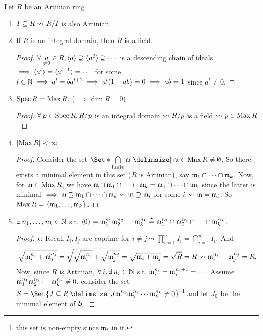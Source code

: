 \begin{prop}
  Let $R$ be an Artinian ring
  \begin{enumerate}[(1)]
    \item $I \subseteq R \leadsto {R}/{I}$ is also Artinian.
    \item If $R$ is an integral domain, then $R$ is a field.
      \begin{proof}
        $\forall \underset{\ne 0}{a} \in R, \gen{a} \supseteq \gen{a^2} \supseteq \dotsm$
        is a descending chain of ideals $\implies \langle a^l\rangle = \langle a^{l+1}\rangle = \dotsm$
        for some $l \in \mathbb{N} \implies a^l = ba^{l+1} \implies a^l(1 - ab) = 0
        \implies ab = 1$ since $a^l \ne 0$.
      \end{proof}
    \item $\operatorname{Spec} R = \operatorname{Max} R$. ($\implies \dim R = 0$)
      \begin{proof}
        $\forall p \in \Spec R, \quot{R}{p}$ is an integral domain
        $\leadsto {R}/{p}$ is a field $\leadsto p \in \operatorname{Max} R$.
      \end{proof}
    \item $\lvert\operatorname{Max} R\rvert < \infty$.
      \begin{proof}
        Consider the set $\Set*{ \bigcap\limits_{\text{finite}} \mf \given \mf \in \Max R}
        \ne \emptyset$. So there exists a minimal element in this set ($R$ is Artinian),
        say $\mathfrak{m}_1 \cap \dots \cap \mathfrak{m}_k$.  Now, for $\mathfrak{m} \in \operatorname{Max} R$, we have
        $\mathfrak{m}\cap \mathfrak{m}_1\cap \dots \cap\mathfrak{m}_k = \mathfrak{m}_1\cap \dots \cap\mathfrak{m}_k$ since the
        latter is minimal $\implies \mathfrak{m} \supseteq \mathfrak{m}_1\cap \dots\cap\mathfrak{m}_k
        \leadsto \mathfrak{m} \supseteq \mathfrak{m}_i$ for some $i$ $\leadsto \mathfrak{m} = \mathfrak{m}_i$.
        So $\operatorname{Max} R = \lbrace\mathfrak{m}_1, \dots, \mathfrak{m}_k\rbrace$.
      \end{proof}
    \item $\exists n_1, \dots, n_k \in \Nb$ s.t.
      $\langle0\rangle = \mathfrak{m}_1^{n_1}\mathfrak{m}_2^{n_2} \dotsm \mathfrak{m}_k^{n_k}
      \overset{\star}{=} \mathfrak{m}_1^{n_1}\cap \mathfrak{m}_2^{n_2} \cap \dots \cap \mathfrak{m}_k^{n_k}$.
      \begin{proof}
        $\star$: Recall $I_i, I_j$ are coprime for $i \ne j \leadsto
        \prod\limits_{i=1}^n I_i = \bigcap\limits_{i=1}^n I_i$.
        And
        \[
          \sqrt{\mathfrak{m}_i^{n_i} + \mathfrak{m}_j^{n_j}}
          = \sqrt{\sqrt{\mathfrak{m}_i^{n_i}} + \sqrt{\mathfrak{m}_j^{n_j}}}
          = \sqrt{\mathfrak{m}_i + \mathfrak{m}_j} = \sqrt{R} = R
          \leadsto \mathfrak{m}_i^{n_i} + \mathfrak{m}_j^{n_j} = R.
        \]
        Now, since $R$ is Artinian, $\forall i, \exists n_i \in \Nb$ s.t.
        $\mathfrak{m}_i^{n_i} = \mathfrak{m}_i^{n_i + 1} = \dotsm$
        Assume $\mathfrak{m}_1^{n_1}\mathfrak{m}_2^{n_2} \dotsm \mathfrak{m}_k^{n_k} \ne 0$, consider
        the set $\Sc = \Set{ J \subseteq R \given J \mf_1^{n_1}\mf_2^{n_2} \dotsm \mf_k^{n_k} \ne 0}$
        \footnote{this set is non-empty since $\mathfrak{m}_i$ in it.}
        and let $J_0$ be the minimal element of $\mathcal{S}$.


\end{proof}
\end{enumerate}
\end{prop}
